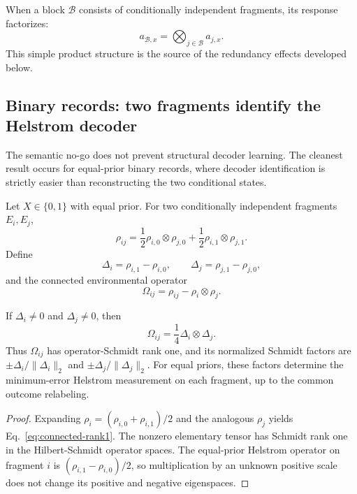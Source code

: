 When a block $\mathcal B$ consists of conditionally independent fragments, its response factorizes:
\begin{equation}
a_{\mathcal B,x}=\bigotimes_{j\in\mathcal B}a_{j,x}.
\label{eq:block-factor}
\end{equation}
This simple product structure is the source of the redundancy effects developed below.


\subsection{Binary records: two fragments identify the Helstrom decoder}
\label{sec:binary}

The semantic no-go does not prevent structural decoder learning.  The cleanest result occurs for equal-prior binary records, where decoder identification is strictly easier than reconstructing the two conditional states.

Let $X\in\{0,1\}$ with equal prior.  For two conditionally independent fragments $E_i,E_j$,
\begin{equation}
\rho_{ij}=\frac12\rho_{i,0}\otimes\rho_{j,0}
+\frac12\rho_{i,1}\otimes\rho_{j,1}.
\label{eq:binary-state}
\end{equation}
Define
\begin{equation}
\Delta_i=\rho_{i,1}-\rho_{i,0},\qquad
\Delta_j=\rho_{j,1}-\rho_{j,0},
\end{equation}
and the connected environmental operator
\begin{equation}
\Omega_{ij}=\rho_{ij}-\rho_i\otimes\rho_j.
\end{equation}

\begin{theorem}
\label{thm:binary-helstrom}
If $\Delta_i\neq0$ and $\Delta_j\neq0$, then
\begin{equation}
\Omega_{ij}=\frac14\Delta_i\otimes\Delta_j.
\label{eq:connected-rank1}
\end{equation}
Thus $\Omega_{ij}$ has operator-Schmidt rank one, and its normalized Schmidt factors are $\pm\Delta_i/\|\Delta_i\|_2$ and $\pm\Delta_j/\|\Delta_j\|_2$.  For equal priors, these factors determine the minimum-error Helstrom measurement on each fragment, up to the common outcome relabeling.
\end{theorem}

\begin{proof}
Expanding $\rho_i=(\rho_{i,0}+\rho_{i,1})/2$ and the analogous $\rho_j$ yields Eq.~\eqref{eq:connected-rank1}.  The nonzero elementary tensor has Schmidt rank one in the Hilbert-Schmidt operator spaces.  The equal-prior Helstrom operator on fragment $i$ is $(\rho_{i,1}-\rho_{i,0})/2$, so multiplication by an unknown positive scale does not change its positive and negative eigenspaces.\qedhere
\end{proof}


